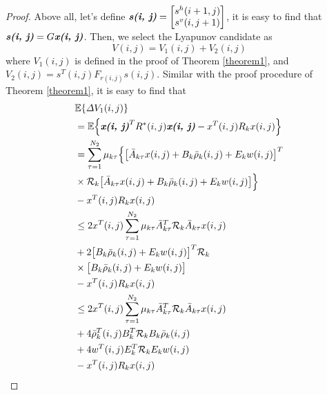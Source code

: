 \documentclass[journal,final,twocolumn]{IEEEtran}
\begin{document}
\begin{proof} 
	Above all, let's define $\emph{\textbf{s(i, j)}} = \begin{bmatrix}
	s^{h}(i+1,j)\\ s^{v}(i,j+1)
	\end{bmatrix}$,  it is easy to find that $\emph{\textbf{s(i, j)}}=G\emph{\textbf{x(i, j)}}$.  Then, we select the Lyapunov candidate as
	\begin{equation}\label{LyapunoovT}
		V(i,j)=V_{1}(i,j)+V_{2}(i,j)
	\end{equation}
	where $V_{1}(i,j)$ is defined in the proof of Theorem \ref{theorem1}, and $V_{2}(i,j)=s^{T}(i,j)F_{r(i,j)}s(i,j)$. Similar with the proof procedure of Theorem \ref{theorem1}, it is easy to find that
	\begin{equation} \label{P2T1}
		\begin{split}
				&\mathbb{E}\{\varDelta V_{1}(i,j) \}\\
			&=\mathbb{E}\Big\{\emph{\textbf{x(i, j)}}^{T}R^{*}(i,j)\emph{\textbf{x(i, j)}} - x^{T}(i,j)R_{k}x(i,j)\Big\}\\
			&=  \sum_{\tau =1}^{N_{2}}\mu_{k\tau }\Big\{\big[\bar{A}_{k\tau }x(i,j)+B_{k}\bar{\rho}_{k}(i,j)+E_{k}w(i,j)\big]^{T}\\
			&\times\mathcal{R}_{k} \big[ \bar{A}_{k\tau }x(i,j)+B_{k}\bar{\rho}_{k}(i,j)+E_{k}w(i,j)\big]\Big\}\\
			&-x^{T}(i,j)R_{k}x(i,j)\\
			&\leq 2x^{T}(i,j)\sum_{\tau =1}^{N_{2}}\mu_{k\tau }\bar{A}^{T}_{k\tau }\mathcal{R}_{k}\bar{A}_{k\tau }x(i,j) \\
			&+2\big[B_{k}\bar{\rho}_{k}(i,j)+E_{k}w(i,j)\big]^{T}\mathcal{R}_{k}\\
			&\times\big[B_{k}\bar{\rho}_{k}(i,j)+E_{k}w(i,j)\big]\\
			&-x^{T}(i,j)R_{k}x(i,j)\\
			&\leq 2x^{T}(i,j)\sum_{\tau =1}^{N_{2}}\mu_{k\tau }\bar{A}^{T}_{k\tau }\mathcal{R}_{k}\bar{A}_{k\tau }x(i,j) \\
			&+ 4\bar{\rho}^{T}_{k}(i,j)B^{T}_{k}\mathcal{R}_{k}B_{k}\bar{\rho}_{k}(i,j)\\
			&+4w^{T}(i,j)E^{T}_{k}\mathcal{R}_{k}E_{k}w(i,j)\\
			&-x^{T}(i,j)R_{k}x(i,j)

\end{split}
\end{equation}
\end{proof}
\end{document}
